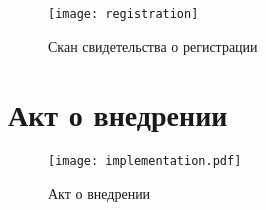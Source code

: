 
\begin{center}
    \begin{figure}[hb]
        \texttt{[image: registration]}
        \caption{Скан свидетельства о регистрации}\label{app:fig:registration}
    \end{figure}
\end{center}
    


\chapter{Акт о внедрении}\label{ch:app2}

\begin{center}
    \begin{figure}[hb]
        \texttt{[image: implementation.pdf]}
        \caption{Акт о внедрении}\label{app:fig:implementation}
    \end{figure}
\end{center}